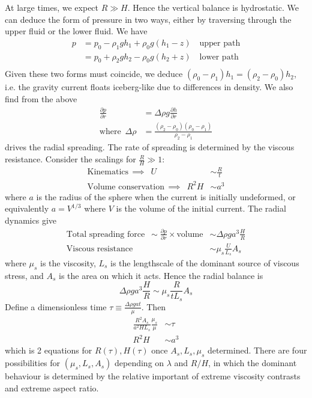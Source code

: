 \documentclass{jknotes}
\begin{document}
At large times, we expect $R \gg H$. Hence the vertical balance is
hydrostatic. We can deduce the form of pressure in two ways, either by
traversing through the upper fluid or the lower fluid. We have
\begin{align}
	p &= p_0 - \rho_1 g h_1 + \rho_0 g (h_1-z) \hspace{1em} \text{upper path}\\
	  &= p_0 + \rho_2 g h_2 - \rho_0 g(h_2 + z) \hspace{1em} \text{lower path} \\
\end{align}
Given these two forms must coincide, we deduce $(\rho_0 - \rho_1) h_1 =
(\rho_2 - \rho_0) h_2$, i.e. the gravity current floats iceberg-like due to
differences in density. We also find from the above
\begin{align}
	\frac{\partial p}{\partial r} &= \Delta \rho g \frac{\partial h}{\partial
	r} \\
	\text{where} \,\,\, \Delta \rho &= \frac{(\rho_2 -
	\rho_0)(\rho_0-\rho_1)}{\rho_2 - \rho_1}
\end{align}
drives the radial spreading. The rate of spreading is determined by the
viscous resistance. Consider the scalings for $\frac{R}{H} \gg 1$:
\begin{align}
	\text{Kinematics} \, \implies \,\,\, U &\sim \frac{R}{t} \\
	\text{Volume conservation}\, \implies \,\,\, R^2 H &\sim a^3
\end{align}
where $a$ is the radius of the sphere when the current is initially
undeformed, or equivalently $a = V^{1/3}$ where $V$ is the volume of the
initial current. The radial dynamics give
\begin{align}
	\text{Total spreading force} \,\,\, \sim \frac{\partial p}{\partial r}
	\times \text{volume} &\sim \Delta \rho g a^3 \frac{H}{R} \\
	\text{Viscous resistance} &\sim \mu_s \frac{U}{L_s} A_s
\end{align}
where $\mu_s$ is the viscosity, $L_s$ is the lengthscale of the dominant
source of viscous stress, and $A_s$ is the area on which it acts. Hence the
radial balance is
\begin{equation}
	\Delta \rho g a^3 \frac{H}{R} \sim \mu_s \frac{R}{tL_s} A_s
\end{equation}
Define a dimensionless time $\tau \equiv \frac{\Delta \rho g a t}{\mu}$.
Then
\begin{align}
	\frac{R^2 A_s}{a^2 HL_s} \frac{\mu_s}{\mu} &\sim \tau \\
	R^2 H &\sim a^3
\end{align}
which is 2 equations for $R(\tau), H(\tau)$ once $A_s, L_s, \mu_s$ determined.
There are four possibilities for $(\mu_s, L_s, A_s)$ depending on $\lambda$
and $R/H$, in which the dominant behaviour is determined by the relative
important of extreme viscosity contrasts and extreme aspect ratio.
\end{document}
